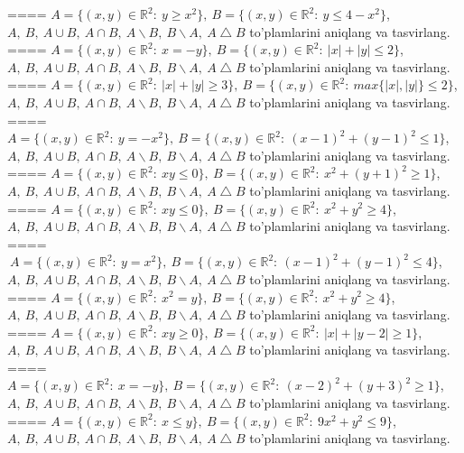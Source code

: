 ====
\(A = \{(x,y) \in \mathbb{R}^{2}:\ y \geq x^{2}\},\ B = \{(x,y) \in \mathbb{R}^{2}:\ y \leq 4 - x^{2}\}\), \(A,\ B,\ A \cup B,\ A \cap B,\ A \backslash B,\ B \backslash A,\ A \bigtriangleup B\) to'plamlarini aniqlang va tasvirlang.
====
\(A = \{(x,y) \in \mathbb{R}^{2}:\ x = - y\},\ B = \{(x,y) \in \mathbb{R}^{2}:\ |x| + |y| \leq 2\}\), \(A,\ B,\ A \cup B,\ A \cap B,\ A \backslash B,\ B \backslash A,\ A \bigtriangleup B\) to'plamlarini aniqlang va tasvirlang.
====
\(A = \{(x,y) \in \mathbb{R}^{2}:\ |x| + |y| \geq 3\},\ B = \{(x,y) \in \mathbb{R}^{2}:\ max\{|x|,|y|\} \leq 2\}\), \(A,\ B,\ A \cup B,\ A \cap B,\ A \backslash B,\ B \backslash A,\ A \bigtriangleup B\) to'plamlarini aniqlang va tasvirlang.
====
\(A = \{(x,y) \in \mathbb{R}^{2}:\ y = - x^{2}\},\ B = \{(x,y) \in \mathbb{R}^{2}:\ (x - 1)^{2} + (y - 1)^{2} \leq 1\}\), \(A,\ B,\ A \cup B,\ A \cap B,\ A \backslash B,\ B \backslash A,\ A \bigtriangleup B\) to'plamlarini aniqlang va tasvirlang.
====
\(A = \{(x,y) \in \mathbb{R}^{2}:\ xy \leq 0\},\ B = \{(x,y) \in \mathbb{R}^{2}:\ x^{2} + (y + 1)^{2} \geq 1\}\), \(A,\ B,\ A \cup B,\ A \cap B,\ A \backslash B,\ B \backslash A,\ A \bigtriangleup B\) to'plamlarini aniqlang va tasvirlang.
====
\(A = \{(x,y) \in \mathbb{R}^{2}:\ xy \leq 0\},\ B = \{(x,y) \in \mathbb{R}^{2}:\ x^{2} + y^{2} \geq 4\}\), \(A,\ B,\ A \cup B,\ A \cap B,\ A \backslash B,\ B \backslash A,\ A \bigtriangleup B\) to'plamlarini aniqlang va tasvirlang.
====
\(\ A = \{(x,y) \in \mathbb{R}^{2}:\ y = x^{2}\},\ B = \{(x,y) \in \mathbb{R}^{2}:\ (x - 1)^{2} + (y - 1)^{2} \leq 4\}\), \(A,\ B,\ A \cup B,\ A \cap B,\ A \backslash B,\ B \backslash A,\ A \bigtriangleup B\) to'plamlarini aniqlang va tasvirlang.
====
\(A = \{(x,y) \in \mathbb{R}^{2}:\ x^{2} = y\},\ B = \{(x,y) \in \mathbb{R}^{2}:\ x^{2} + y^{2} \geq 4\}\), \(A,\ B,\ A \cup B,\ A \cap B,\ A \backslash B,\ B \backslash A,\ A \bigtriangleup B\) to'plamlarini aniqlang va tasvirlang.
====
\(A = \{(x,y) \in \mathbb{R}^{2}:\ xy \geq 0\},\ B = \{(x,y) \in \mathbb{R}^{2}:\ |x| + |y - 2| \geq 1\}\), \(A,\ B,\ A \cup B,\ A \cap B,\ A \backslash B,\ B \backslash A,\ A \bigtriangleup B\) to'plamlarini aniqlang va tasvirlang.
====
\(A = \{(x,y) \in \mathbb{R}^{2}:\ x = - y\},\ B = \{(x,y) \in \mathbb{R}^{2}:\ (x - 2)^{2} + (y + 3)^{2} \geq 1\}\), \(A,\ B,\ A \cup B,\ A \cap B,\ A \backslash B,\ B \backslash A,\ A \bigtriangleup B\) to'plamlarini aniqlang va tasvirlang.
====
\(A = \{(x,y) \in \mathbb{R}^{2}:\ x \leq y\},\ B = \{(x,y) \in \mathbb{R}^{2}:\ 9x^{2} + y^{2} \leq 9\}\), \(A,\ B,\ A \cup B,\ A \cap B,\ A \backslash B,\ B \backslash A,\ A \bigtriangleup B\) to'plamlarini aniqlang va tasvirlang.

